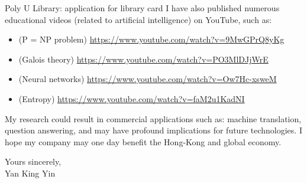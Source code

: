\documentclass[10pt,a4paper]{letter}
\begin{document}
\begin{letter}{Poly U Library: application for library card}
I have also published numerous educational videos (related to artificial intelligence) on YouTube, such as:
\begin{itemize}
\item (P = NP problem) \hyperref[https://www.youtube.com/watch?v=9MwGPrQ8yKg]{https://www.youtube.com/watch?v=9MwGPrQ8yKg}
\item (Galois theory) \hyperref[https://www.youtube.com/watch?v=PO3MlDJjWrE]{https://www.youtube.com/watch?v=PO3MlDJjWrE}
\item (Neural networks) \hyperref[https://www.youtube.com/watch?v=Ow7Hc-xsweM]{https://www.youtube.com/watch?v=Ow7Hc-xsweM}
\item (Entropy) \hyperref[https://www.youtube.com/watch?v=faM2u1KadNI]{https://www.youtube.com/watch?v=faM2u1KadNI}
\end{itemize}

My research could result in commercial applications such as:  machine translation, question answering, and may have profound implications for future technologies.  I hope my company may one day benefit the Hong-Kong and global economy.

\closing{Yours sincerely,\\ Yan King Yin} 


\end{letter} 
\end{document}
